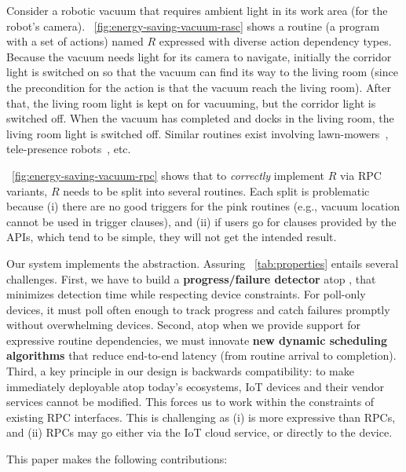 Consider a robotic vacuum that requires ambient light in its work area (for the robot's camera).
\Figure~\ref{fig:energy-saving-vacuum-rasc} shows a routine (a program with a set of actions) named $R$ expressed with diverse action dependency types. {Because the vacuum needs light for its camera to navigate, initially the corridor light is switched on so that the vacuum can find its way to the living room (since the precondition for the action is that the vacuum reach the living room). After that, the living room light is kept on for vacuuming, but the corridor light is switched off. When the vacuum has completed and docks in the living room, the living room light is switched off. } 
Similar routines exist involving lawn-mowers~\cite{santhoshini2024implementation}, tele-presence robots~\cite{tsui2011exploring}, etc.  

\Figure~\ref{fig:energy-saving-vacuum-rpc} shows that to {\it correctly} implement $R$ via RPC variants, $R$ needs to be split into several routines. 
Each split is problematic because (i) there are no good triggers for the pink routines (e.g., vacuum location cannot be used in trigger clauses), and (ii) if users go for clauses provided by the APIs, which tend to be simple, they will not get the intended result.

Our system \sysname{} implements the \abstraction{} abstraction. 
Assuring \Table~\ref{tab:properties} entails several challenges. 
First, we have to build a {\bf progress/failure detector} atop \abs, that minimizes detection time while respecting device constraints.
For poll-only devices,
it must poll often enough to track progress and catch failures promptly without overwhelming devices.
Second,
atop \abs{} when we provide support for expressive routine dependencies, we must innovate {\bf new dynamic scheduling algorithms} that reduce end-to-end latency (from routine arrival to completion).
%
Third, a key principle in our design is backwards compatibility: to make \sysname{} immediately deployable atop today’s ecosystems, IoT devices and their vendor services cannot be modified. This forces us to work within the constraints of existing RPC interfaces.
This is challenging as (i) \abs{} is more expressive than RPCs, and (ii) RPCs may go either via the IoT cloud service, or directly to the device.


This paper makes the following contributions:

